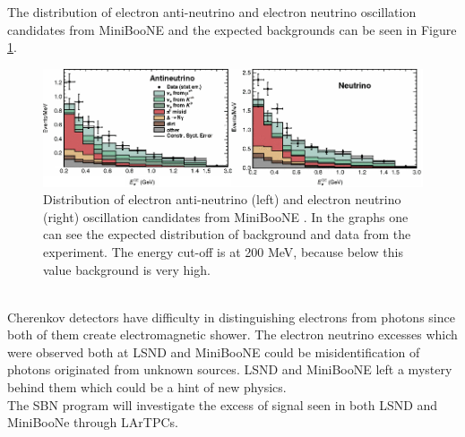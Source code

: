 \documentclass[a4paper]{article}\linespread{1.4}
\begin{document}
The distribution of electron anti-neutrino and electron neutrino oscillation candidates from MiniBooNE and the expected backgrounds can be seen in Figure \ref{fig:ndata}. 
\begin{figure}[h!] \centering \includegraphics[width=124mm,scale=1.0]{figures/ndata.png} \caption{Distribution of electron anti-neutrino (left) and electron neutrino (right) oscillation candidates from MiniBooNE \cite{KP}. In the graphs one can see the expected distribution of background and data from the experiment. The energy cut-off is at 200 MeV, because below this value background is very high.} \label{fig:ndata}\end{figure}  
\\Cherenkov detectors have difficulty in distinguishing electrons from photons since both of them create electromagnetic shower.
The electron neutrino excesses which were observed both at LSND and MiniBooNE could be misidentification of photons originated from unknown sources.
LSND and MiniBooNE left a mystery behind them which could be a hint of new physics. %
\\The SBN program will investigate the excess of signal seen in both LSND and MiniBooNe through LArTPCs.
\end{document}

